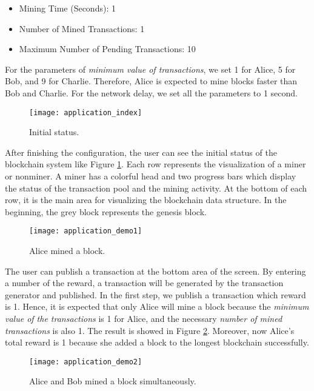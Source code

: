 \begin{itemize}
    \item Mining Time (Seconds): 1
    \item Number of Mined Transactions: 1
    \item Maximum Number of Pending Transactions: 10
\end{itemize}

For the parameters of \textit{minimum value of transactions}, we set 1 for Alice, 5 for Bob, and 9 for Charlie. Therefore, Alice is expected to mine blocks faster than Bob and Charlie. For the network delay, we set all the parameters to 1 second.

\begin{figure}[htb]
    \centering
    \texttt{[image: application\_index]}
    \caption{Initial status.}
    \label{fig:initial status}
\end{figure}

After finishing the configuration, the user can see the initial status of the blockchain system like Figure \ref{fig:initial status}. Each row represents the visualization of a miner or nonminer. A miner has a colorful head and two progress bars which display the status of the transaction pool and the mining activity. At the bottom of each row, it is the main area for visualizing the blockchain data structure. In the beginning, the grey block represents the genesis block.

\begin{figure}[htb]
    \centering
    \texttt{[image: application\_demo1]}
    \caption{Alice mined a block.}
    \label{fig:alice mined a block}
\end{figure}

The user can publish a transaction at the bottom area of the screen. By entering a number of the reward, a transaction will be generated by the transaction generator and published. In the first step, we publish a transaction which reward is 1. Hence, it is expected that only Alice will mine a block because the \textit{minimum value of the transactions} is 1 for Alice, and the necessary \textit{number of mined transactions} is also 1. The result is showed in Figure \ref{fig:alice mined a block}. Moreover, now Alice's total reward is 1 because she added a block to the longest blockchain successfully.

\begin{figure}[htb]
    \centering
    \texttt{[image: application\_demo2]}
    \caption{Alice and Bob mined a block simultaneously.}
    \label{fig:alice and bob mined a block simultaneously}
\end{figure}

